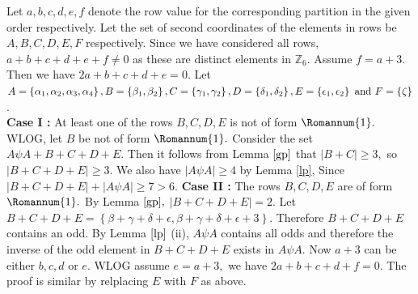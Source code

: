 \documentclass[reqno,10pt]{amsart}
\newtheorem{remar}[prop]{Remark}
\newcommand{\ZZ}{{\mathbb Z}}
\newcommand{\one}{ \Romannum {1}}
\begin{document}
 Let $a,b,c,d,e,f$ denote the row value for the corresponding partition in the given order respectively. Let the set of second coordinates of the elements in rows be $A,B,C,D,E,F$ respectively. Since we have considered all rows, $ a+b+c+d+e+f \neq 0$ as these are distinct elements in $\ZZ_6.$  Assume $f = a+3.$ Then we have $ 2a+b+c+d+e = 0.$ Let $A = \left\lbrace \alpha_1,\alpha_2,\alpha_3,\alpha_4 \right\rbrace,
   B = \left\lbrace \beta_1,\beta_2 \right\rbrace,
   C = \left\lbrace \gamma_1,\gamma_2 \right\rbrace,
  D = \left\lbrace \delta_1,\delta_2 \right\rbrace,\\
   E = \left\lbrace \epsilon_1,\epsilon_2 \right\rbrace \ \mathrm{and} \ F = \left\lbrace \zeta \right\rbrace$.\\
\textbf{Case I :} At least one of the rows $B,C,D,E$ is not of form $\one.$ WLOG, let $B$ be not of form $\one.$ Consider the set $ A \psi A +B+C+D+E $. Then it follows from Lemma $\ref{gp}$ that $ |B + C| \geq 3 ,$ so $ |B+C+D+E | \geq 3$.  We also have $|A \psi A| \geq 4$ by Lemma \ref{lp}, Since $ |B+C+D+E| +|A \psi A| \geq 7 > 6  .$
\textbf{Case II :}
The rows $B,C,D,E$ are of form $\one.$
By Lemma $\ref{gp},$ $ |B+C+D+E| = 2. $ Let $B+C+D+E = \left\lbrace \beta+\gamma+\delta+\epsilon,\beta+\gamma+\delta+\epsilon+3 \right\rbrace$. Therefore $B+C+D+E$ contains an odd. By Lemma $\ref{lp}$ (ii), $ A \psi A$ contains all odds and therefore the inverse of the odd element in $B+C+D+E$ exists in $A \psi A.$ 
Now $a+3$ can be either $b,c,d$ or $e.$ WLOG assume $e=a+3,$  we have $ 2a+b+c+d+f = 0.$ The proof is similar by relplacing $E$ with $F$ as above.
\end{document}
